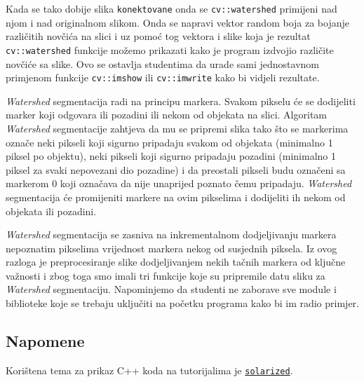 \documentclass[a4paper, 12pt]{article}
\begin{document}
Kada se tako dobije slika \lstinline{konektovane} onda se \lstinline{cv::watershed} primijeni nad njom i nad originalnom slikom. Onda se napravi vektor random boja za bojanje različitih novčića na slici i uz pomoć tog vektora i slike koja je rezultat \lstinline{cv::watershed} funkcije možemo prikazati kako je program izdvojio različite novčiće sa slike. Ovo se ostavlja studentima da urade sami jednostavnom primjenom funkcije \lstinline{cv::imshow} ili \lstinline{cv::imwrite} kako bi vidjeli rezultate.

\textit{Watershed} segmentacija radi na principu markera. Svakom pikselu će se dodijeliti marker koji odgovara ili pozadini ili nekom od objekata na slici. Algoritam \textit{Watershed} segmentacije zahtjeva da mu se pripremi slika tako što se markerima označe neki pikseli koji sigurno pripadaju svakom od objekata (minimalno 1 piksel po objektu), neki pikseli koji sigurno pripadaju pozadini (minimalno 1 piksel za svaki nepovezani dio pozadine) i da preostali pikseli budu označeni sa markerom 0 koji označava da nije unaprijed poznato čemu pripadaju. \textit{Watershed} segmentacija će promijeniti markere na ovim pikselima i dodijeliti ih nekom od objekata ili pozadini.

\textit{Watershed} segmentacija se zasniva na inkrementalnom dodjeljivanju markera nepoznatim pikselima vrijednost markera nekog od susjednih piksela. Iz ovog razloga je preprocesiranje slike dodjeljivanjem nekih tačnih markera od ključne važnosti i zbog toga smo imali tri funkcije koje su pripremile datu sliku za \textit{Watershed} segmentaciju. Napominjemo da studenti ne zaborave sve module i biblioteke koje se trebaju uključiti na početku programa kako bi im radio primjer.

\subsection*{Napomene}

Korištena tema za prikaz C++ koda na tutorijalima je \href{https://ethanschoonover.com/solarized/}{\lstinline{solarized}}\cite{solarized}.

\printbibliography
\end{document}
